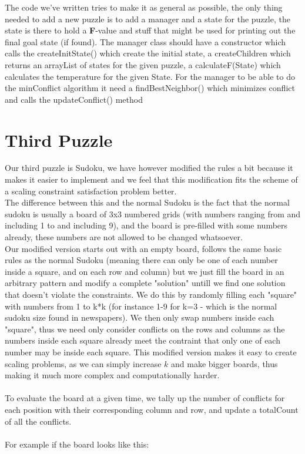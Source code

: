 \documentclass[12pt, a4paper]{article}
\begin{document}
The code we've written tries to make it as general as possible, the only thing needed to add a new puzzle is to add a manager and a state for the puzzle, the state is there to hold a \textbf{F}-value and stuff that might be used for printing out the final goal state (if found). The manager class should have a constructor which calls the createInitState() which create the initial state, a createChildren which returns an arrayList of states for the given puzzle, a calculateF(State) which calculates the temperature for the given State. For the manager to be able to do the minConflict algorithm it need a findBestNeighbor() which minimizes conflict and calls the updateConflict() method
\section{Third Puzzle}
Our third puzzle is Sudoku, we have however modified the rules a bit because it makes it easier to implement and we feel that this modification fits the scheme of a scaling constraint satisfaction problem better.\\
The difference between this and the normal Sudoku is the fact that the normal sudoku is usually a board of 3x3 numbered grids (with numbers ranging from and including 1 to and including 9), and the board is pre-filled with some numbers already, these numbers are not allowed to be changed whatsoever.\\
Our modified version starts out with an empty board, follows the same basic rules as the normal Sudoku (meaning there can only be one of each number inside a square, and on each row and column) but we just fill the board in an arbitrary pattern and modify a complete "solution" untill we find one solution that doesn't violate the constraints. We do this by randomly filling each "square" with numbers from 1 to k*k (for instance 1-9 for k=3 - which is the normal sudoku size found in newspapers). We then only swap numbers inside each "square", thus we need only consider conflicts on the rows and columns as the numbers inside each square already meet the contraint that only one of each number may be inside each square. This modified version makes it easy to create scaling problems, as we can simply increase $k$ and make bigger boards, thus making it much more complex and computationally harder.
\\\\
To evaluate the board at a given time, we tally up the number of conflicts for each position with their corresponding column and row, and update a totalCount of all the conflicts.
\\\\
For example if the board looks like this:
\end{document}
